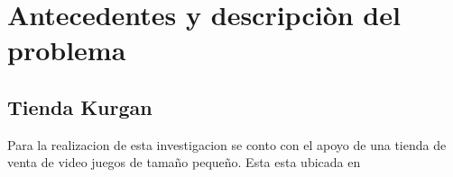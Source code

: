 \section{Antecedentes y descripciòn del problema}

\subsection{Tienda Kurgan}

Para la realizacion de esta investigacion se conto con el apoyo de una tienda de venta de video juegos de 
tamaño pequeño. Esta esta ubicada en  








